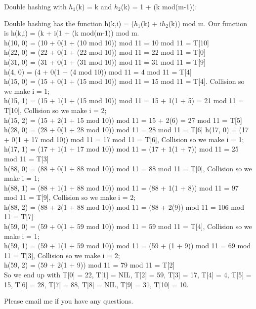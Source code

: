 \documentclass[12pt]{article}
\begin{document}
\begin{enumerate}
Double hashing with $h_1$(k) = k and $h_2$(k) = 1 + (k mod(m-1)):

Double hashing has the function h(k,i) = ($h_1$(k) + i$h_2$(k)) mod m. Our function is 
h(k,i) = (k + i(1 + (k mod(m-1)) mod m. \\

h(10, 0) = (10 + 0(1 + (10 mod 10)) mod 11 = 10 mod 11 = T[10] \\
h(22, 0) = (22 + 0(1 + (22 mod 10)) mod 11 = 22 mod 11 = T[0] \\
h(31, 0) = (31 + 0(1 + (31 mod 10)) mod 11 = 31 mod 11 = T[9] \\
h(4, 0) = (4 + 0(1 + (4 mod 10)) mod 11 = 4 mod 11 = T[4] \\
h(15, 0) = (15 + 0(1 + (15 mod 10)) mod 11 = 15 mod 11 = T[4]. Collision so we make i = 1;\\
h(15, 1) = (15 + 1(1 + (15 mod 10)) mod 11 = 15 + 1(1 + 5) = 21 mod 11 = T[10], Collision so we make i = 2;\\
h(15, 2) = (15 + 2(1 + 15 mod 10)) mod 11 = 15 + 2(6) = 27 mod 11 = T[5] \\
h(28, 0) = (28 + 0(1 + 28 mod 10)) mod 11 = 28 mod 11 = T[6]
h(17, 0) = (17 + 0(1 + 17 mod 10)) mod 11 = 17 mod 11 = T[6], Collision so we make i = 1; \\
h(17, 1) = (17 + 1(1 + 17 mod 10)) mod 11 = (17 + 1(1 + 7)) mod 11 = 25 mod 11 = T[3] \\
h(88, 0) = (88 + 0(1 + 88 mod 10)) mod 11 = 88 mod 11 = T[0], Collision so we make i = 1; \\
h(88, 1) = (88 + 1(1 + 88 mod 10)) mod 11 = (88 + 1(1 + 8)) mod 11 = 97 mod 11 = T[9], Collision so we make i = 2; \\
h(88, 2) = (88 + 2(1 + 88 mod 10)) mod 11 = (88 + 2(9)) mod 11 = 106 mod 11 = T[7] \\
h(59, 0) = (59 + 0(1 + 59 mod 10)) mod 11 = 59 mod 11 = T[4], Collision so we make i = 1; \\
h(59, 1) = (59 + 1(1 + 59 mod 10)) mod 11 = (59 + (1 + 9)) mod 11 = 69 mod 11 = T[3], Collision so we make i = 2; \\
h(59, 2) = (59 + 2(1 + 9)) mod 11 = 79 mod 11 =  T[2] \\
So we end up with T[0] = 22, T[1] = NIL, T[2] = 59, T[3] = 17, T[4] = 4, T[5] = 15, T[6] = 28, T[7] = 88, T[8] = NIL, T[9] = 31, T[10] = 10. 
\end{enumerate}
 
 
 Please email me if you have any questions.

 
\end{document}
